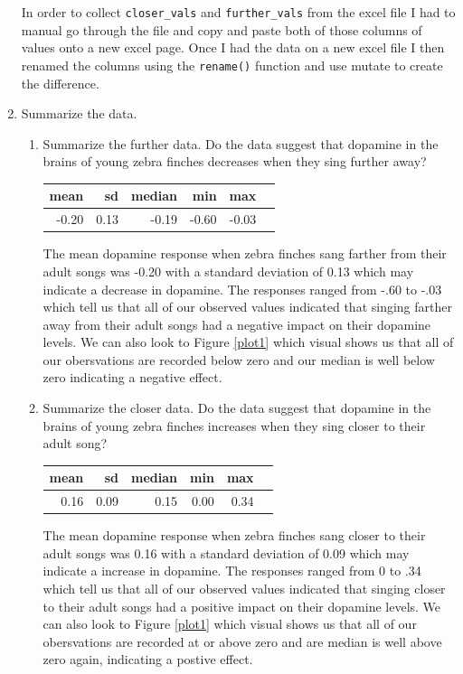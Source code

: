 \documentclass{article}\usepackage[]{graphicx}\usepackage[]{xcolor}
\begin{document}
\begin{enumerate}
In order to collect \texttt{closer\_vals} and \texttt{further\_vals} from the excel file I had to manual go through the file and copy and paste both of those columns of values onto a new excel page. Once I had the data on a new excel file I then renamed the columns using the \verb|rename()| function and use mutate to create the difference. 
\item Summarize the data.
\begin{enumerate}
  \item Summarize the further data. Do the data suggest that
   dopamine in the brains of young zebra finches decreases when
   they sing further away?
\begin{table}[ht]
\centering
\begin{tabular}{rrrrrr}
  \hline
mean & sd & median & min & max \\ 
  \hline
-0.20 & 0.13 & -0.19 & -0.60 & -0.03 \\ 
   \hline
\end{tabular}
\end{table}
   
The mean dopamine response when zebra finches sang farther from their adult songs was -0.20 with a standard deviation of 0.13 which may indicate a decrease in dopamine. The responses ranged from -.60 to -.03 which tell us that all of our observed values indicated that singing farther away from their adult songs had a negative impact on their dopamine levels. We can also look to Figure \ref{plot1} which visual shows us that all of our obersvations are recorded below zero and our median is well below zero indicating a negative effect.  
   
   \item Summarize the closer data. Do the data suggest that
   dopamine in the brains of young zebra finches increases when
   they sing closer to their adult song?
 \begin{table}[ht]
\centering
\begin{tabular}{rrrrrr}
  \hline
mean & sd & median & min & max \\ 
  \hline
0.16 & 0.09 & 0.15 & 0.00 & 0.34 \\ 
   \hline
\end{tabular}
\end{table}
   
   The mean dopamine response when zebra finches sang closer to their adult songs was 0.16 with a standard deviation of 0.09 which may indicate a increase in dopamine. The responses ranged from 0 to .34 which tell us that all of our observed values indicated that singing closer to their adult songs had a positive impact on their dopamine levels. We can also look to Figure \ref{plot1} which visual shows us that all of our obersvations are recorded at or above zero and are median is well above zero again, indicating a postive effect. 
   

\end{enumerate}
\end{enumerate}
\end{document}
